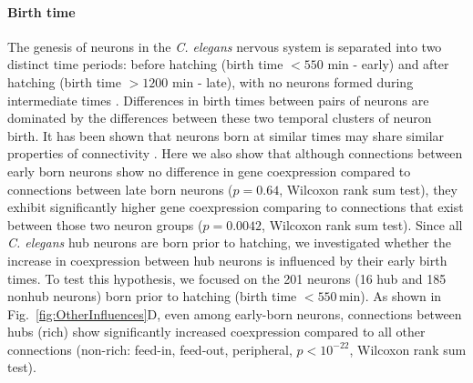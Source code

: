 \documentclass[10pt,letterpaper]{article}
\begin{document}
\paragraph{Birth time}
The genesis of neurons in the \emph{C. elegans} nervous system is separated into two distinct time periods: before hatching (birth time $<550$ min - early) and after hatching (birth time $>1200$ min - late), with no neurons formed during intermediate times \cite{Varier2011}.
Differences in birth times between pairs of neurons are dominated by the differences between these two temporal clusters of neuron birth.
It has been shown that neurons born at similar times may share similar properties of connectivity \cite{Schroter:2017eo}.
Here we also show that although connections between early born neurons show no difference in gene coexpression compared to connections between late born neurons ($p=0.64$, Wilcoxon rank sum test), they exhibit significantly higher gene coexpression comparing to connections that exist between those two neuron groups ($p = 0.0042$, Wilcoxon rank sum test).
Since all \emph{C. elegans} hub neurons are born prior to hatching, we investigated whether the increase in coexpression between hub neurons is influenced by their early birth times.
To test this hypothesis, we focused on the 201 neurons (16 hub and 185 nonhub neurons) born prior to hatching (birth time $<550$\,min).
As shown in Fig.~\ref{fig:OtherInfluences}D, even among early-born neurons, connections between hubs (rich) show significantly increased coexpression compared to all other connections (non-rich: feed-in, feed-out, peripheral, $p < 10^{-22}$, Wilcoxon rank sum test).

\end{document}
